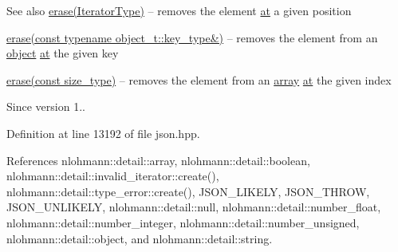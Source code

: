 \begin{DoxySeeAlso}{See also}
\hyperlink{classnlohmann_1_1basic__json_a068a16e76be178e83da6a192916923ed}{erase(\+Iterator\+Type)} -- removes the element \hyperlink{classnlohmann_1_1basic__json_a73ae333487310e3302135189ce8ff5d8}{at} a given position 

\hyperlink{classnlohmann_1_1basic__json_a2f8484d69c55d8f2a9697a7bec29362a}{erase(const typename object\+\_\+t\+::key\+\_\+type\&)} -- removes the element from an \hyperlink{classnlohmann_1_1basic__json_aa13f7c0615867542ce80337cbcf13ada}{object} \hyperlink{classnlohmann_1_1basic__json_a73ae333487310e3302135189ce8ff5d8}{at} the given key 

\hyperlink{classnlohmann_1_1basic__json_a88cbcefe9a3f4d294bed0653550a5cb9}{erase(const size\+\_\+type)} -- removes the element from an \hyperlink{classnlohmann_1_1basic__json_aa80485befaffcadaa39965494e0b4d2e}{array} \hyperlink{classnlohmann_1_1basic__json_a73ae333487310e3302135189ce8ff5d8}{at} the given index
\end{DoxySeeAlso}
\begin{DoxySince}{Since}
version 1.. 
\end{DoxySince}


Definition at line 13192 of file json.\+hpp.



References nlohmann\+::detail\+::array, nlohmann\+::detail\+::boolean, nlohmann\+::detail\+::invalid\+\_\+iterator\+::create(), nlohmann\+::detail\+::type\+\_\+error\+::create(), J\+S\+O\+N\+\_\+\+L\+I\+K\+E\+LY, J\+S\+O\+N\+\_\+\+T\+H\+R\+OW, J\+S\+O\+N\+\_\+\+U\+N\+L\+I\+K\+E\+LY, nlohmann\+::detail\+::null, nlohmann\+::detail\+::number\+\_\+float, nlohmann\+::detail\+::number\+\_\+integer, nlohmann\+::detail\+::number\+\_\+unsigned, nlohmann\+::detail\+::object, and nlohmann\+::detail\+::string.


